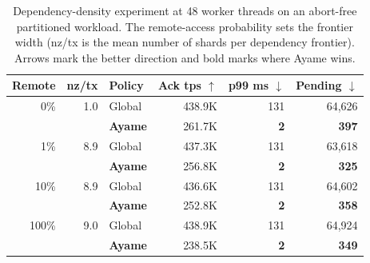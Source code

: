 \begin{table}[tb]
  \centering
  \caption{Dependency-density experiment at 48 worker threads on an abort-free partitioned workload.  The remote-access probability sets the frontier width (nz/tx is the mean number of shards per dependency frontier).  Arrows mark the better direction and bold marks where Ayame wins.}
  \label{tab:dep-density}
  \small
  \setlength{\tabcolsep}{4pt}
  \begin{tabular}{rrlrrr}
    \hline
    Remote & nz/tx & Policy & Ack tps $\uparrow$ & p99 ms $\downarrow$ & Pending $\downarrow$ \\
    \hline
    0\% & 1.0 & Global & 438.9K & 131 & 64,626 \\
     &  & \textbf{Ayame} & 261.7K & \textbf{2} & \textbf{397} \\
    \hline
    1\% & 8.9 & Global & 437.3K & 131 & 63,618 \\
     &  & \textbf{Ayame} & 256.8K & \textbf{2} & \textbf{325} \\
    \hline
    10\% & 8.9 & Global & 436.6K & 131 & 64,602 \\
     &  & \textbf{Ayame} & 252.8K & \textbf{2} & \textbf{358} \\
    \hline
    100\% & 9.0 & Global & 438.9K & 131 & 64,924 \\
     &  & \textbf{Ayame} & 238.5K & \textbf{2} & \textbf{349} \\
    \hline
  \end{tabular}
\end{table}
